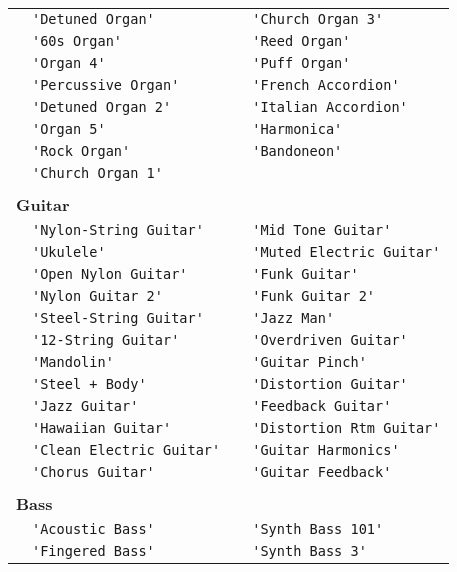\documentclass{article}
\newcommand{\instrusection}[1]{ \\[5pt] \multicolumn{4}{l}{\textbf{#1}}\\}
\newcommand\lvlo{}
\newcommand\lvlt{\ding{105}}
\begin{document}
\begin{center}
\begin{longtable}{ll|ll}
 \lvlt & \lstinline!'Detuned Organ'! & \lvlt & \lstinline!'Church Organ 3'! \\
 \lvlt & \lstinline!'60s Organ'! & \lvlo & \lstinline!'Reed Organ'! \\
 \lvlt & \lstinline!'Organ 4'! & \lvlt & \lstinline!'Puff Organ'! \\
 \lvlo & \lstinline!'Percussive Organ'! & \lvlo & \lstinline!'French Accordion'! \\
 \lvlt & \lstinline!'Detuned Organ 2'! & \lvlt & \lstinline!'Italian Accordion'! \\
 \lvlt & \lstinline!'Organ 5'! & \lvlo & \lstinline!'Harmonica'! \\
 \lvlo & \lstinline!'Rock Organ'! & \lvlo & \lstinline!'Bandoneon'! \\
 \lvlo & \lstinline!'Church Organ 1'! \\
\instrusection{Guitar}
 \lvlo & \lstinline!'Nylon-String Guitar'! & \lvlt & \lstinline!'Mid Tone Guitar'! \\
 \lvlt & \lstinline!'Ukulele'! & \lvlo & \lstinline!'Muted Electric Guitar'! \\
 \lvlt & \lstinline!'Open Nylon Guitar'! & \lvlt & \lstinline!'Funk Guitar'! \\
 \lvlt & \lstinline!'Nylon Guitar 2'! & \lvlt & \lstinline!'Funk Guitar 2'! \\
 \lvlo & \lstinline!'Steel-String Guitar'! & \lvlt & \lstinline!'Jazz Man'! \\
 \lvlt & \lstinline!'12-String Guitar'! & \lvlo & \lstinline!'Overdriven Guitar'! \\
 \lvlt & \lstinline!'Mandolin'! & \lvlt & \lstinline!'Guitar Pinch'! \\
 \lvlt & \lstinline!'Steel + Body'! & \lvlo & \lstinline!'Distortion Guitar'! \\
 \lvlo & \lstinline!'Jazz Guitar'! & \lvlt & \lstinline!'Feedback Guitar'! \\
 \lvlt & \lstinline!'Hawaiian Guitar'! & \lvlt & \lstinline!'Distortion Rtm Guitar'! \\
 \lvlo & \lstinline!'Clean Electric Guitar'! & \lvlo & \lstinline!'Guitar Harmonics'! \\
 \lvlt & \lstinline!'Chorus Guitar'! & \lvlt & \lstinline!'Guitar Feedback'! \\
\instrusection{Bass}
 \lvlo & \lstinline!'Acoustic Bass'! & \lvlt & \lstinline!'Synth Bass 101'! \\
 \lvlo & \lstinline!'Fingered Bass'! & \lvlt & \lstinline!'Synth Bass 3'! \\

\end{longtable}
\end{center}
\end{document}
